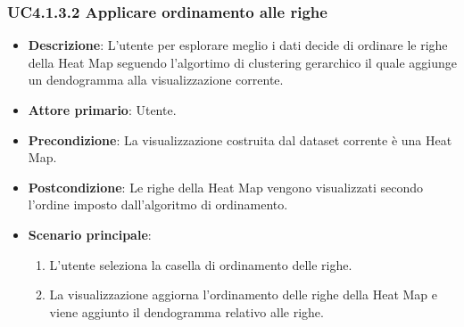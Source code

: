 \subsubsection{UC4.1.3.2 Applicare ordinamento alle righe}
\label{subsec:uc4.1.3.2}
\begin{itemize}
    \item \textbf{Descrizione}: L’utente per esplorare meglio i dati decide di ordinare le righe della Heat Map
                                seguendo l'algortimo di clustering gerarchico il quale aggiunge un dendogramma alla visualizzazione corrente.
	
    \item \textbf{Attore primario}: Utente.
    
    \item \textbf{Precondizione}:   La visualizzazione costruita dal dataset corrente è una Heat Map.
    \item \textbf{Postcondizione}:  Le righe della Heat Map vengono visualizzati secondo l'ordine imposto dall'algoritmo di ordinamento.

	\item \textbf{Scenario principale}:
        \begin{enumerate}
            \item   L'utente seleziona la casella di ordinamento delle righe.
            \item   La visualizzazione aggiorna l'ordinamento delle righe della Heat Map e viene aggiunto 
                    il dendogramma relativo alle righe.
        \end{enumerate}
\end{itemize}

